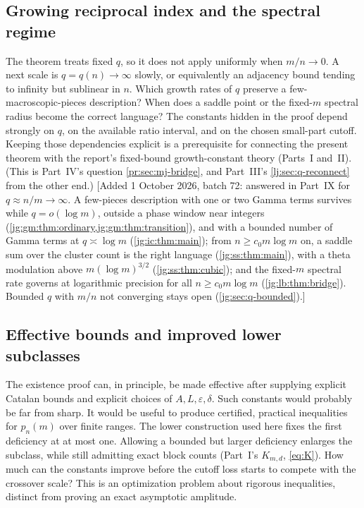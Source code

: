 \documentclass[11pt,a4paper]{article}
\theoremstyle{definition}\newaliascnt{definition}{theorem}
\theoremstyle{remark}\newaliascnt{remark}{theorem}
\begin{document}
\subsection{Growing reciprocal index and the spectral regime}
\label{pr:sec:q-growing}
The theorem treats fixed $q$, so it does not apply uniformly when
$m/n\to0$. A next scale is $q=q(n)\to\infty$ slowly, or equivalently an
adjacency bound tending to infinity but sublinear in $n$. Which growth rates
of $q$ preserve a few-macroscopic-pieces description? When does a saddle
point or the fixed-$m$ spectral radius become the correct language? The
constants hidden in the proof depend strongly on $q$, on the available ratio
interval, and on the chosen small-part cutoff. Keeping those dependencies
explicit is a prerequisite for connecting the present theorem with the
report's fixed-bound growth-constant theory (Parts~I and~II). (This is
Part~IV's question \cref{pr:sec:mj-bridge}, and Part~III's
\cref{lj:sec:q-reconnect} from the other end.)
[Added 1 October 2026, batch 72: answered in Part~IX for $q\approx n/m\to\infty$.
A few-pieces description with one or two Gamma terms survives while
$q=o(\log m)$, outside a phase window near integers
(\cref{jg:gm:thm:ordinary,jg:gm:thm:transition}), and with a bounded number of
Gamma terms at $q\asymp\log m$ (\cref{jg:ic:thm:main}); from
$n\ge c_0m\log m$ on, a saddle sum over the cluster count is the right language
(\cref{jg:ss:thm:main}), with a theta modulation above $m(\log m)^{3/2}$
(\cref{jg:ss:thm:cubic}); and the fixed-$m$ spectral rate governs at
logarithmic precision for all $n\ge c_0m\log m$ (\cref{jg:lb:thm:bridge}).
Bounded $q$ with $m/n$ not converging stays open (\cref{jg:sec:q-bounded}).]

\subsection{Effective bounds and improved lower subclasses}
\label{pr:sec:q-effective}
The existence proof can, in principle, be made effective after supplying
explicit Catalan bounds and explicit choices of $A,L,\varepsilon,\delta$.
Such constants would probably be far from sharp. It would be useful to
produce certified, practical inequalities for $p_n(m)$ over finite ranges.
The lower construction used here fixes the first deficiency at at most one.
Allowing a bounded but larger deficiency enlarges the subclass, while still
admitting exact block counts (Part~I's $K_{m,d}$, \eqref{eq:K}). How much can
the constants improve before the cutoff loss starts to compete with the
crossover scale? This is an optimization problem about rigorous
inequalities, distinct from proving an exact asymptotic amplitude.
\end{document}
